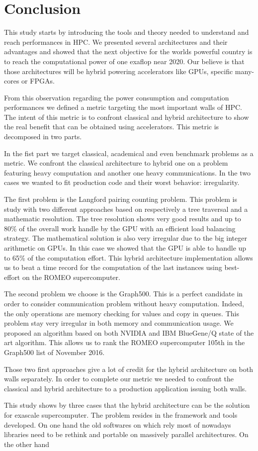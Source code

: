\chapter*{Conclusion}
This study starts by introducing the tools and theory needed to understand and reach performances in HPC. 
We presented several architectures and their advantages and showed that the next objective for the worlds powerful country is to reach the computational power of one exaflop near 2020. 
Our believe is that those architectures will be hybrid powering accelerators like GPUs, specific many-cores or FPGAs. 

From this observation regarding the power consumption and computation performances we defined a metric targeting the most important walls of HPC. 
The intent of this metric is to confront classical and hybrid architecture to show the real benefit that can be obtained using accelerators. 
This metric is decomposed in two parts. 

In the fist part we target classical, academical and even benchmark problems as a metric. 
We confront the classical architecture to hybrid one on a problem featuring heavy computation and another one heavy communications. 
In the two cases we wanted to fit production code and their worst behavior: irregularity. 

The first problem is the Langford pairing counting problem. 
This problem is study with two different approaches based on respectively a tree traversal and a mathematic resolution. 
The tree resolution shows very good results and up to 80\% of the overall work handle by the GPU with an efficient load balancing strategy. 
The mathematical solution is also very irregular due to the big integer arithmetic on GPUs. 
In this case we showed that the GPU is able to handle up to 65\% of the computation effort. 
This hybrid architecture implementation allows us to beat a time record for the computation of the last instances using best-effort on the ROMEO supercomputer. 

The second problem we choose is the Graph500. 
This is a perfect candidate in order to consider communication problem without heavy computation. 
Indeed, the only operations are memory checking for values and copy in queues. 
This problem stay very irregular in both memory and communication usage. 
We proposed an algorithm based on both NVIDIA and IBM BlueGene/Q state of the art algorithm. 
This allows us to rank the ROMEO supercomputer 105th in the Graph500 list of November 2016.

Those two first approaches give a lot of credit for the hybrid architecture on both walls separately. 
In order to complete our metric we needed to confront the classical and hybrid architecture to a production application issuing both walls. 


This study shows by three cases that the hybrid architecture can be the solution for exascale supercomputer.
The problem resides in the framework and tools developed. 
On one hand the old softwares on which rely most of nowadays libraries need to be rethink and portable on massively parallel architectures. 
On the other hand 

